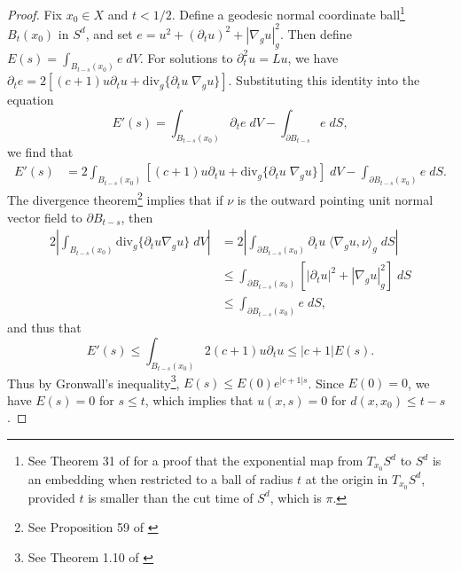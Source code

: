 \begin{proof}
  Fix $x_0 \in X$ and $t < 1/2$. Define a geodesic normal coordinate ball\footnote{See Theorem 31 of \cite{spivakvol4} for a proof that the exponential map from $T_{x_0} S^d$ to $S^d$ is an embedding when restricted to a ball of radius $t$ at the origin in $T_{x_0} S^d$, provided $t$ is smaller than the cut time of $S^d$, which is $\pi$.} $B_t(x_0)$ in $S^d$, and set $e = u^2 + (\partial_t u)^2 + |\nabla_g u|_g^2$. Then define $E(s) = \int_{B_{t-s}(x_0)} e\; dV$. For solutions to $\partial_t^2 u = Lu$, we have $\partial_t e = 2[ (c + 1) u \partial_t u + \text{div}_g \{ \partial_t u\; \nabla_g u \} ]$.
  Substituting this identity into the equation
  \begin{equation}
    E'(s) = \int_{B_{t-s}(x_0)} \partial_t e\; dV - \int_{\partial B_{t-s}} e\; dS,
  \end{equation}
  we find that
  \begin{equation}
  \begin{split}
    E'(s) &= 2 \int_{B_{t-s}(x_0)} [(c+1) u \partial_t u + \text{div}_g \{ \partial_t u\; \nabla_g u \}]\; dV - \int_{\partial B_{t-s}(x_0)} e\; dS.
  \end{split}
  \end{equation}
  The divergence theorem\footnote{See Proposition 59 of \cite{spivakvol4}} implies that if $\nu$ is the outward pointing unit normal vector field to $\partial B_{t-s}$, then
  \begin{equation}
  \begin{split}
    2 \left| \int_{B_{t-s}(x_0)} \text{div}_g \{ \partial_t u \nabla_g u \}\; dV \right| &= 2 \left| \int_{\partial B_{t-s}(x_0)} \partial_t u\;\! \langle \nabla_g u, \nu \rangle_g\; dS \right|\\
    &\leq \int_{\partial B_{t-s}(x_0)} [|\partial_t u|^2 + |\nabla_g u|_g^2]\; dS\\
    &\leq \int_{\partial B_{t-s}(x_0)} e\; dS,
  \end{split}
  \end{equation}
  and thus that
  \begin{equation}
    E'(s) \leq \int_{B_{t-s}(x_0)} 2(c+1) u \partial_t u \leq |c + 1| E(s).
  \end{equation}
  Thus by Gronwall's inequality\footnote{See Theorem 1.10 of \cite{TaoDispersive}}, $E(s) \leq E(0) e^{|c+1|s}$. Since $E(0) = 0$, we have $E(s) = 0$ for $s \leq t$, which implies that $u(x,s) = 0$ for $d(x,x_0) \leq t - s$.
\end{proof}


